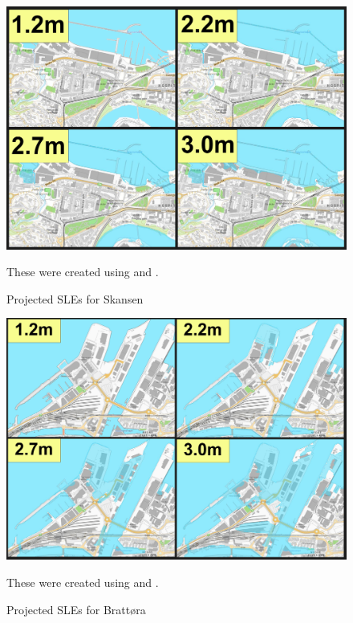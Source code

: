 \begin{figure}[H]
    \centering
    \includegraphics[width=16cm]{fig_sle/skansen-sle-num.png}
    \caption{Projected SLEs for Skansen}{These were created using \cite{kartverket_se_2021} and \cite{stormflo_database_stormflo_2021}. }
    \label{fig:sle_skansen_num}
\end{figure}

\begin{figure}[H]
    \centering
    \includegraphics[width=16cm]{fig_sle/brattora-sle-num.png}
    \caption{Projected SLEs for Brattøra}{ These were created using \cite{kartverket_se_2021} and \cite{stormflo_database_stormflo_2021}. }
    \label{fig:sle_brattora_num}
\end{figure}

